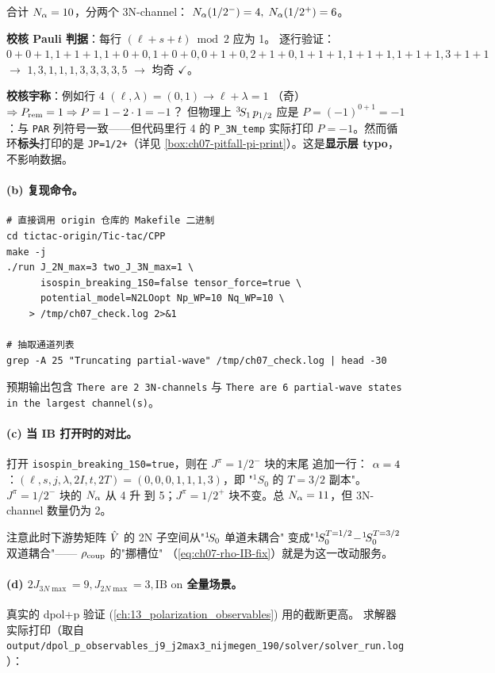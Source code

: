\begin{numericalbox}[label={box:ch07-numerical-closure}]
合计 \(N_\alpha = 10\)，分两个 3N-channel：
\(N_\alpha(1/2^-) = 4,\;N_\alpha(1/2^+) = 6\)。

\textbf{校核 Pauli 判据}：每行 \((\ell + s + t) \bmod 2\) 应为 1。
逐行验证：\(0+0+1, 1+1+1, 1+0+0, 1+0+0, 0+1+0, 2+1+0, 1+1+1, 1+1+1, 1+1+1, 3+1+1\) \(\to\)
\(1, 3, 1, 1, 1, 3, 3, 3, 3, 5\) \(\to\) 均奇 \(\checkmark\)。

\textbf{校核宇称}：例如行 4 \((\ell, \lambda) = (0, 1) \to \ell+\lambda=1\)
（奇）\(\Rightarrow P_{\rm rem} = 1 \Rightarrow P = 1 - 2 \cdot 1 = -1\)？
但物理上 \({}^{3}\!S_{1}\, p_{1/2}\) 应是 \(P = (-1)^{0+1} = -1\)：与
\verb|PAR| 列符号一致——但代码里行 4 的 \verb|P_3N_temp| 实际打印
\(P = -1\)。然而循环\textbf{标头}打印的是
\verb|JP=1/2+|（详见
\cref{box:ch07-pitfall-pi-print}）。这是\textbf{显示层 typo}，不影响数据。

\paragraph{(b) 复现命令。}
\begin{lstlisting}[style=config]
# 直接调用 origin 仓库的 Makefile 二进制
cd tictac-origin/Tic-tac/CPP
make -j
./run J_2N_max=3 two_J_3N_max=1 \
      isospin_breaking_1S0=false tensor_force=true \
      potential_model=N2LOopt Np_WP=10 Nq_WP=10 \
    > /tmp/ch07_check.log 2>&1

# 抽取通道列表
grep -A 25 "Truncating partial-wave" /tmp/ch07_check.log | head -30
\end{lstlisting}
预期输出包含 \texttt{There are 2 3N-channels} 与 \texttt{There are 6 partial-wave
states in the largest channel(s)}。

\paragraph{(c) 当 IB 打开时的对比。}
打开 \texttt{isospin\_breaking\_1S0=true}，则在 \(J^\pi = 1/2^-\) 块的末尾
追加一行：
\(\alpha = 4\)：\((\ell, s, j, \lambda, 2I, t, 2T) = (0, 0, 0, 1, 1, 1, 3)\)，即
"\({}^1S_0\) 的 \(T = 3/2\) 副本"。\(J^\pi = 1/2^-\) 块的 \(N_\alpha\) 从 4 升
到 5；\(J^\pi = 1/2^+\) 块不变。总 \(N_\alpha = 11\)，但 3N-channel 数量仍为 2。

注意此时下游势矩阵 \(\hat{V}\) 的 2N 子空间从"\({}^{1}\!S_{0}\) 单道未耦合"
变成"\({}^{1}\!S_{0}^{T=1/2}\!-\!{}^{1}\!S_{0}^{T=3/2}\) 双道耦合"——
\(\rho_{\rm coup}\) 的"挪槽位"
（\cref{eq:ch07-rho-IB-fix}）就是为这一改动服务。

\paragraph{(d) \(2J_{3N\max} = 9, J_{2N\max} = 3, \text{IB on}\) 全量场景。}
真实的 dpol+p 验证 (\cref{ch:13_polarization_observables}) 用的截断更高。
求解器实际打印（取自 \texttt{output/dpol\_p\_observables\_j9\_j2max3\_nijmegen\_190/solver/solver\_run.log}）：


\end{numericalbox}
